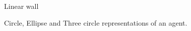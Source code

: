 \documentclass[]{article}
\begin{document}
%

\begin{multicols*}{2}

\end{multicols*}

\begin{multicols*}{2}


\end{multicols*}

\begin{figure}[H]
\centering

\caption{Linear wall}
\end{figure}
\begin{multicols*}{2}

\end{multicols*}

\newpage

\begin{figure}[H]
\centering

\caption{Circle, Ellipse and Three circle representations of an agent.}
\end{figure}



\begin{multicols*}{2}

\end{multicols*}
\end{document}
